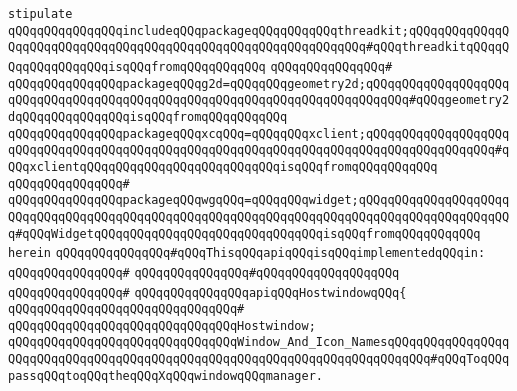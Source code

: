 \newline
\verb|stipulate|\newline
\verb|qQQqqQQqqQQqqQQqincludeqQQqpackageqQQqqQQqqQQqthreadkit;qQQqqQQqqQQqqQQqqQQqqQQqqQQqqQQqqQQqqQQqqQQqqQQqqQQqqQQqqQQqqQQq#qQQqthreadkitqQQqqQQqqQQqqQQqqQQqisqQQqfromqQQqqQQqqQQq|\newline
\verb|qQQqqQQqqQQqqQQq#|\newline
\verb|qQQqqQQqqQQqqQQqpackageqQQqg2d=qQQqqQQqgeometry2d;qQQqqQQqqQQqqQQqqQQqqQQqqQQqqQQqqQQqqQQqqQQqqQQqqQQqqQQqqQQqqQQqqQQqqQQqqQQq#qQQqgeometry2dqQQqqQQqqQQqqQQqisqQQqfromqQQqqQQqqQQq|\newline
\verb|qQQqqQQqqQQqqQQqpackageqQQqxcqQQq=qQQqqQQqxclient;qQQqqQQqqQQqqQQqqQQqqQQqqQQqqQQqqQQqqQQqqQQqqQQqqQQqqQQqqQQqqQQqqQQqqQQqqQQqqQQqqQQqqQQq#qQQqxclientqQQqqQQqqQQqqQQqqQQqqQQqqQQqisqQQqfromqQQqqQQqqQQq|\newline
\verb|qQQqqQQqqQQqqQQq#|\newline
\verb|qQQqqQQqqQQqqQQqpackageqQQqwgqQQq=qQQqqQQqwidget;qQQqqQQqqQQqqQQqqQQqqQQqqQQqqQQqqQQqqQQqqQQqqQQqqQQqqQQqqQQqqQQqqQQqqQQqqQQqqQQqqQQqqQQqqQQq#qQQqWidgetqQQqqQQqqQQqqQQqqQQqqQQqqQQqqQQqisqQQqfromqQQqqQQqqQQq|\newline
\verb|herein|\newline
\newline
\verb|qQQqqQQqqQQqqQQq#qQQqThisqQQqapiqQQqisqQQqimplementedqQQqin:|\newline
\verb|qQQqqQQqqQQqqQQq#|\newline
\verb|qQQqqQQqqQQqqQQq#qQQqqQQqqQQqqQQqqQQq|\newline
\verb|qQQqqQQqqQQqqQQq#|\newline
\verb|qQQqqQQqqQQqqQQqapiqQQqHostwindowqQQq{|\newline
\verb|qQQqqQQqqQQqqQQqqQQqqQQqqQQqqQQq#|\newline
\verb|qQQqqQQqqQQqqQQqqQQqqQQqqQQqqQQqHostwindow;|\newline
\newline
\verb|qQQqqQQqqQQqqQQqqQQqqQQqqQQqqQQqWindow_And_Icon_NamesqQQqqQQqqQQqqQQqqQQqqQQqqQQqqQQqqQQqqQQqqQQqqQQqqQQqqQQqqQQqqQQqqQQqqQQqqQQq#qQQqToqQQqpassqQQqtoqQQqtheqQQqXqQQqwindowqQQqmanager.|\newline
